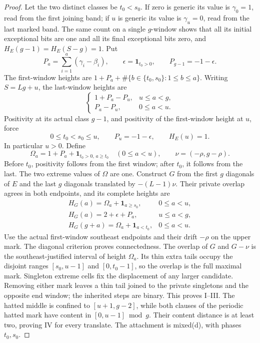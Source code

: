 \documentclass[11pt,a4paper]{amsart}
\numberwithin{equation}{section}
\theoremstyle{plain}
\theoremstyle{definition}
\newcommand{\one}{\mathbf1}
\begin{document}
\begin{proof}
Let the two distinct classes be \(t_0<s_0\).  If zero is generic its value is \(\gamma_0=1\), read from the first joining band; if \(u\) is generic its value is \(\gamma_u=0\), read from the last marked band.  The same count on a single \(g\)-window shows that all its initial exceptional bits are one and all its final exceptional bits zero, and
\(H_E(g-1)=H_E(S-g)=1\).
Put
\[
 P_a=\sum_{i=1}^a(\gamma_i-\beta_i),\qquad
 \epsilon=\one_{t_0>0},\qquad P_{g-1}=-1-\epsilon.
\]
The first-window heights are \(1+P_a+\#\{b\in\{t_0,s_0\}:1\le b\le a\}\).  Writing \(S=Lg+u\), the last-window heights are
\begin{equation}\label{rt:cyclic-last}
 \begin{cases}
 1+P_a-P_u,&u\le a<g,\\
 P_a-P_u,&0\le a<u.
 \end{cases}
\end{equation}
Positivity at its actual class \(g-1\), and positivity of the first-window height at \(u\), force
\[
 0\le t_0<s_0\le u,\qquad P_u=-1-\epsilon,\qquad H_E(u)=1.
\]
In particular \(u>0\).  Define
\[
 \Omega_a=1+P_a+\one_{t_0>0,\,a\ge t_0}\quad(0\le a<u),
 \qquad \nu=(-\rho,g-\rho).
\]
Before \(t_0\), positivity follows from the first window; after \(t_0\), it follows from the last.  The two extreme values of \(\Omega\) are one.  Construct \(G\) from the first \(g\) diagonals of \(E\) and the last \(g\) diagonals translated by \(-(L-1)\nu\).  Their private overlap agrees in both endpoints, and its complete heights are
\begin{equation}\label{rt:mixed-fold-inner}
 \begin{array}{ll}
 H_G(a)=\Omega_a+\one_{a\ge s_0},&0\le a<u,\\
 H_G(a)=2+\epsilon+P_a,&u\le a<g,\\
 H_G(g+a)=\Omega_a+\one_{a<t_0},&0\le a<u.
 \end{array}
\end{equation}
Use the actual first-window southeast endpoints and their drift \(-\rho\) on the upper mark.  The diagonal criterion proves connectedness.  The overlap of \(G\) and \(G-\nu\) is the southeast-justified interval of height \(\Omega_a\).  Its thin extra tails occupy the disjoint ranges \([s_0,u-1]\) and \([0,t_0-1]\), so the overlap is the full maximal mark.  Singleton extreme cells fix the displacement of any larger candidate.  Removing either mark leaves a thin tail joined to the private singletons and the opposite end window; the inherited steps are binary.  This proves I--III.  The hatted middle is confined to \([u+1,g-2]\), while both clauses of the periodic hatted mark have content in \([0,u-1]\bmod g\).  Their content distance is at least two, proving IV for every translate.  The attachment is mixed(d), with phases \(t_0,s_0\).


\end{proof}
\end{document}

